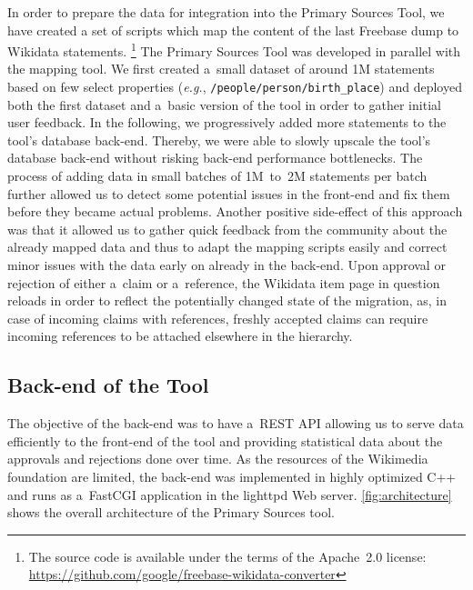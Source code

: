\documentclass{acm_proc_article-sp}
\begin{document}
In order to prepare the data for integration into the Primary Sources Tool,
we have created a set of scripts which map the content
of the last Freebase dump to Wikidata statements.%
\footnote{The source code is available under the terms of the Apache~2.0 license:
\url{https://github.com/google/freebase-wikidata-converter}}
The Primary Sources Tool was developed in parallel with the mapping tool.
We first created a~small dataset of around 1M statements
based on few select properties (\emph{e.g.}, \texttt{/people/person/birth\_place})
and deployed both the first dataset and a~basic version of the tool
in order to gather initial user feedback.
In the following, we progressively added more statements to the tool's database back-end.
Thereby, we were able to slowly upscale the tool's database back-end
without risking back-end performance bottlenecks.
The process of adding data in small batches of 1M~to~2M statements per batch
further allowed us to detect some potential issues in the front-end
and fix them before they became actual problems.
Another positive side-effect of this approach was that it allowed us to gather quick feedback
from the community about the already mapped data and thus to adapt the mapping scripts easily
and correct minor issues with the data early on already in the back-end.
Upon approval or rejection of either a~claim or a~reference,
the Wikidata item page in question reloads in order to reflect
the potentially changed state of the migration, as,
in case of incoming claims with references, freshly accepted claims 
can require incoming references to be attached elsewhere in the hierarchy. 

\subsection{Back-end of the Tool}

The objective of the back-end was to have a~REST API allowing us
to serve data efficiently to the front-end of the tool and
providing statistical data about the approvals and rejections done over time.
As the resources of the Wikimedia foundation are limited,
the back-end was implemented in highly optimized C++
and runs as a~FastCGI application in the lighttpd Web server.
\autoref{fig:architecture} shows the overall architecture of the Primary Sources tool.
\end{document}

